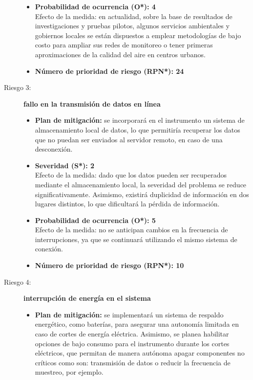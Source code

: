 \begin{description}
\begin{itemize}
		\item \textbf{Probabilidad de ocurrencia (O*): 4} \\
		Efecto de la medida: en actualidad, sobre la base de resultados de investigaciones y pruebas pilotos, algunos servicios ambientales y gobiernos locales se están dispuestos a emplear metodologías de bajo costo para ampliar sus redes de monitoreo o tener primeras aproximaciones de la calidad del aire en centros urbanos.
		\item \textbf{Número de prioridad de riesgo (RPN*): 24}
	\end{itemize}    
	
	\item[Riesgo 3:] \textbf{{fallo en la transmisión de datos en línea}}
	\begin{itemize}
		\item \textbf{Plan de mitigación:} se incorporará en el instrumento un sistema de almacenamiento local de datos, lo que permitiría recuperar los datos que no puedan ser enviados al servidor remoto, en caso de una desconexión.
		
		\item \textbf{Severidad (S*): 2} \\
		Efecto de la medida: dado que los datos pueden ser recuperados mediante el almacenamiento local, la severidad del problema se reduce significativamente. Asimismo, existirá duplicidad de información en dos lugares distintos, lo que dificultará la pérdida de información.
		\item \textbf{Probabilidad de ocurrencia (O*): 5} \\
		Efecto de la medida: no se anticipan cambios en la frecuencia de interrupciones, ya que se continuará utilizando el mismo sistema de conexión.
		
		\item \textbf{Número de prioridad de riesgo (RPN*): 10}
	\end{itemize}
	
	\item[Riesgo 4:] \textbf{{interrupción de energía en el sistema}}
	\begin{itemize}
		\item \textbf{Plan de mitigación:} se implementará un sistema de respaldo energético, como baterías, para asegurar una autonomía limitada en caso de cortes de energía eléctrica. Asimismo, se planea habilitar opciones de bajo consumo para el instrumento durante los cortes eléctricos, que permitan de manera autónoma apagar componentes no críticos como son: transmisión de datos o reducir la frecuencia de muestreo, por ejemplo.
		

\end{itemize}
\end{description}
